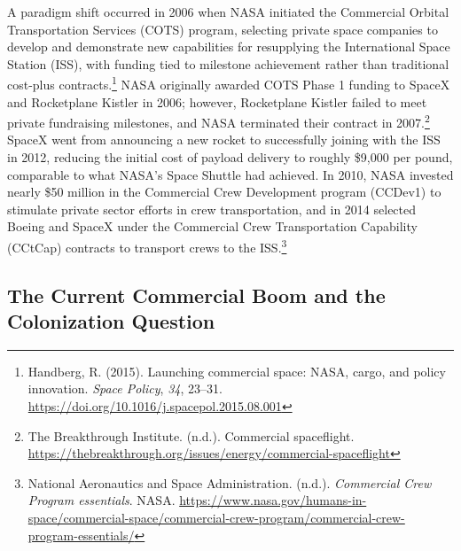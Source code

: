 A paradigm shift occurred in 2006 when NASA initiated the Commercial Orbital Transportation Services (COTS) program, selecting private space companies to develop and demonstrate new capabilities for resupplying the International Space Station (ISS), with funding tied to milestone achievement rather than traditional cost-plus contracts.\footnote{Handberg, R. (2015). Launching commercial space: NASA, cargo, and policy innovation. \emph{Space Policy}, \emph{34}, 23–31. \url{https://doi.org/10.1016/j.spacepol.2015.08.001}} NASA originally awarded COTS Phase 1 funding to SpaceX and Rocketplane Kistler in 2006; however, Rocketplane Kistler failed to meet private fundraising milestones, and NASA terminated their contract in 2007.\footnote{The Breakthrough Institute. (n.d.). Commercial spaceflight. \url{https://thebreakthrough.org/issues/energy/commercial-spaceflight}} SpaceX went from announcing a new rocket to successfully joining with the ISS in 2012, reducing the initial cost of payload delivery to roughly \$9,000 per pound, comparable to what NASA’s Space Shuttle had achieved. In 2010, NASA invested nearly \$50 million in the Commercial Crew Development program (CCDev1) to stimulate private sector efforts in crew transportation, and in 2014 selected Boeing and SpaceX under the Commercial Crew Transportation Capability (CCtCap) contracts to transport crews to the ISS.\footnote{National Aeronautics and Space Administration. (n.d.). \emph{Commercial Crew Program essentials}. NASA. \url{https://www.nasa.gov/humans-in-space/commercial-space/commercial-crew-program/commercial-crew-program-essentials/}}

\subsection{The Current Commercial Boom and the Colonization Question}

